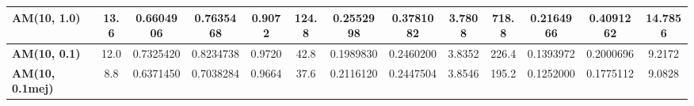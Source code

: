 \begin{table}[H]
\begin{adjustwidth}{-1cm}{-1cm}
\begin{tabular}{|l|c|c|c|c|c|c|c|c|c|c|c|c|}
	\textbf{AM(10, 1.0)}    & 13.6 & 	0.6604906 & 	0.7635468 & 	0.9072 & 	124.8 & 	0.2552998 & 	0.3781082 & 	3.7808 & 	718.8 & 	0.2164966 & 	0.4091262 & 	14.7856 		\\ \hline
	\textbf{AM(10, 0.1)}    & 12.0 & 	0.7325420 & 	0.8234738 & 	0.9720 & 	42.8 & 	0.1989830 & 	0.2460200 & 	3.8352 & 	226.4 & 	0.1393972 & 	0.2000696 & 	9.2172		\\ \hline
	\textbf{AM(10, 0.1mej)}    & 8.8 & 	0.6371450 & 	0.7038284 & 	0.9664 & 	37.6 & 	0.2116120	 & 0.2447504	 & 3.8546 & 	195.2 & 	0.1252000 & 	0.1775112 & 	9.0828		\\ \hline
	\end{tabular}
	
	\end{adjustwidth}
	
\end{table}	


